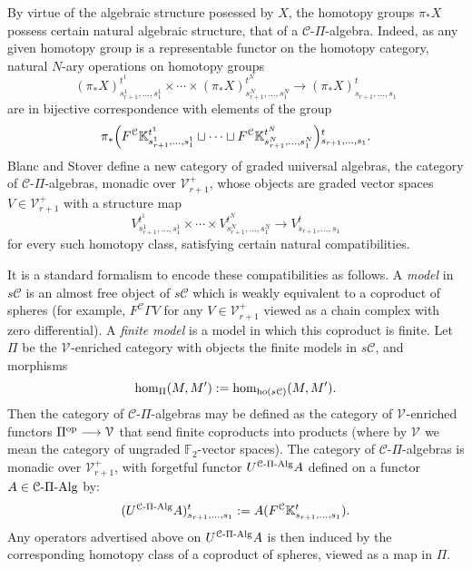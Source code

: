 \documentclass[11pt]{amsart}
\theoremstyle{plain}
\theoremstyle{definition}
\renewcommand{\to}{\longrightarrow}
\newcommand{\calV}{\mathcal{V}}
\newcommand{\calc}{\mathcal{C}}
\theoremstyle{plain}
\newcommand{\vect}[2]{\calV^{#1}_{#2}}
\newcommand{\PiAlg}{\textup{-$\Pi$-Alg}}
\newcommand{\F}{\mathbb{F}}
\newcommand{\Ftwo}{\F_2}
\begin{document}
\begin{CPiAlgs and CHalgs}
By virtue of the algebraic structure posessed by $X$, the homotopy groups $\pi_*X$ possess certain natural algebraic structure, that of a $\calc$-$\Pi$-algebra. Indeed, as any given homotopy group is a representable functor on the homotopy category, natural $N$-ary operations on homotopy groups
\[(\pi_*X)_{s_{r+1}^{1},\ldots,s_{1}^{1}}^{t^1}\times\cdots \times(\pi_*X)_{s_{r+1}^{N},\ldots,s_{1}^{N}}^{t^N}\to (\pi_*X)_{s_{r+1},\ldots,s_{1}}^{t}\]
are in bijective correspondence with elements of the group
\[ \pi_*\Bigl(F^\calc\mathbb{K}_{s_{r+1}^{1},\ldots,s_{1}^{1}}^{t^1}\sqcup\cdots\sqcup F^\calc\mathbb{K}_{s_{r+1}^{N},\ldots,s_{1}^{N}}^{t^N}\Bigr)\makebox[0cm][l]{}_{s_{r+1},\ldots,s_{1}}^{t}.\]
Blanc and Stover \cite{Blanc_Stover-Groth_SS.pdf} define a new category of graded universal algebras, the category of $\calc$-$\Pi$-algebras, monadic over $\vect{+}{r+1}$, whose objects are graded vector spaces $V\in\vect{+}{r+1}$ with a structure map 
\[V_{s_{r+1}^{1},\ldots,s_{1}^{1}}^{t^1}\times\cdots \times V_{s_{r+1}^{N},\ldots,s_{1}^{N}}^{t^N}\to V_{s_{r+1},\ldots,s_{1}}^{t}\]
for every such homotopy class, satisfying certain natural compatibilities.

It is a standard formalism to encode these compatibilities as follows. A \emph{model}  \cite{Blanc_Stover-Groth_SS.pdf} in $s\calc$ is 
an almost free object of $s\calc$ which is weakly equivalent to a coproduct of spheres (for example, $F^{\calc}\Gamma V$ for any $V\in\vect{+}{r+1}$ viewed as a chain complex with zero differential). A \emph{finite model} is a model in which this coproduct is finite. Let $\Pi$  be the $\vect{}{}$-enriched category with objects the finite models in $s\calc$, and morphisms
\[\hom_{\Pi}(M,M'):=\hom_{\textup{ho}(s\calc)}(M,M').\]
Then the category of $\calc$-$\Pi$-algebras  may be defined as the category of $\vect{}{}$-enriched functors $\Pi^\textup{op}\to \vect{}{}$ that send finite coproducts into products (where by $\vect{}{}$ we mean the category of ungraded $\Ftwo $-vector spaces). The category of $\calc$-$\Pi$-algebras is monadic over $\vect{+}{r+1}$, with  forgetful functor $U^{\calc\PiAlg}A$ defined on a functor $A\in \calc\PiAlg$ by:%
\[(U^{\calc\PiAlg}A)^t_{s_{r+1},\ldots,s_1}:=A(F^\calc\mathbb{K}_{s_{r+1},\ldots,s_{1}}^{t}).\]
Any operators advertised above on $U^{\calc\PiAlg}A$ is then induced by the corresponding homotopy class of a coproduct of spheres, viewed as a map in $\Pi$. %


\end{CPiAlgs and CHalgs}
\end{document}

